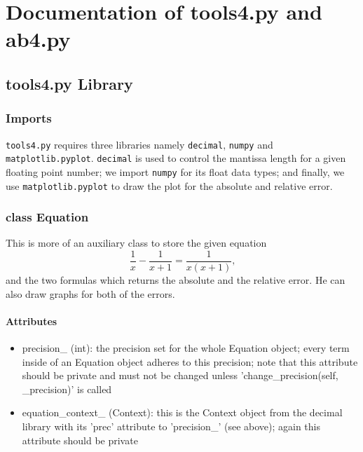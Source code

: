 \section{Documentation of tools4.py and ab4.py}
\subsection{tools4.py Library}
\subsubsection{Imports}
\texttt{tools4.py} requires three libraries namely \texttt{decimal}, \texttt{numpy} and \texttt{matplotlib.pyplot}. \texttt{decimal} is used to control the mantissa length for a given floating point number; we import \texttt{numpy} for its float data types; and finally, we use \texttt{matplotlib.pyplot} to draw the plot for the absolute and relative error.
\subsubsection{class Equation}
This is more of an auxiliary class to store the given equation
\begin{equation*}
    \frac{1}{x} - \frac{1}{x + 1} = \frac{1}{x (x + 1)} \text{,}
\end{equation*}
and the two formulas which returns the absolute and the relative error. He can also draw graphs for both of
the errors.
\paragraph{Attributes}
\begin{itemize}
    \item precision\_ (int): the precision set for the whole Equation object; every term inside of an Equation
    object adheres to this precision; note that this attribute should be private and must not be changed
    unless 'change\_precision(self, \_precision)' is called
    \item equation\_context\_ (Context): this is the Context object from the decimal library with its 'prec'
    attribute to 'precision\_' (see above); again this attribute should be private
\end{itemize}
